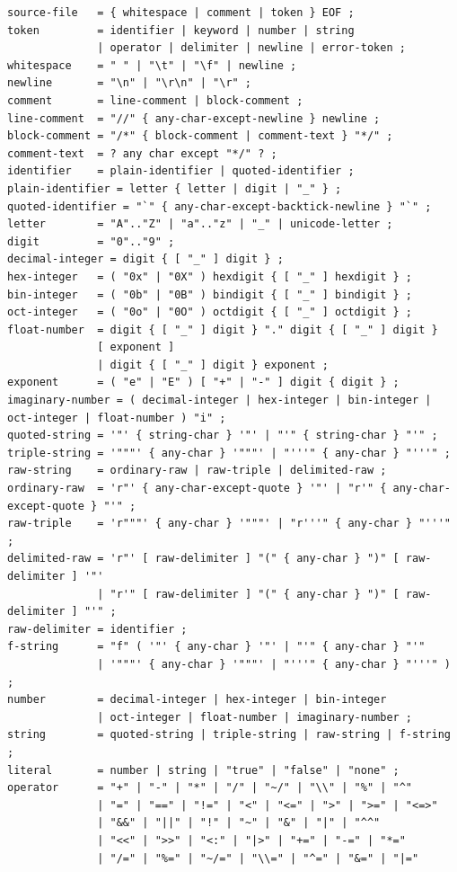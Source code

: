 \documentclass[UTF8,12pt]{ctexart}
\begin{document}
\begin{lstlisting}
source-file   = { whitespace | comment | token } EOF ;
token         = identifier | keyword | number | string
              | operator | delimiter | newline | error-token ;
whitespace    = " " | "\t" | "\f" | newline ;
newline       = "\n" | "\r\n" | "\r" ;
comment       = line-comment | block-comment ;
line-comment  = "//" { any-char-except-newline } newline ;
block-comment = "/*" { block-comment | comment-text } "*/" ;
comment-text  = ? any char except "*/" ? ;
identifier    = plain-identifier | quoted-identifier ;
plain-identifier = letter { letter | digit | "_" } ;
quoted-identifier = "`" { any-char-except-backtick-newline } "`" ;
letter        = "A".."Z" | "a".."z" | "_" | unicode-letter ;
digit         = "0".."9" ;
decimal-integer = digit { [ "_" ] digit } ;
hex-integer   = ( "0x" | "0X" ) hexdigit { [ "_" ] hexdigit } ;
bin-integer   = ( "0b" | "0B" ) bindigit { [ "_" ] bindigit } ;
oct-integer   = ( "0o" | "0O" ) octdigit { [ "_" ] octdigit } ;
float-number  = digit { [ "_" ] digit } "." digit { [ "_" ] digit }
              [ exponent ]
              | digit { [ "_" ] digit } exponent ;
exponent      = ( "e" | "E" ) [ "+" | "-" ] digit { digit } ;
imaginary-number = ( decimal-integer | hex-integer | bin-integer | oct-integer | float-number ) "i" ;
quoted-string = '"' { string-char } '"' | "'" { string-char } "'" ;
triple-string = '"""' { any-char } '"""' | "'''" { any-char } "'''" ;
raw-string    = ordinary-raw | raw-triple | delimited-raw ;
ordinary-raw  = 'r"' { any-char-except-quote } '"' | "r'" { any-char-except-quote } "'" ;
raw-triple    = 'r"""' { any-char } '"""' | "r'''" { any-char } "'''" ;
delimited-raw = 'r"' [ raw-delimiter ] "(" { any-char } ")" [ raw-delimiter ] '"'
              | "r'" [ raw-delimiter ] "(" { any-char } ")" [ raw-delimiter ] "'" ;
raw-delimiter = identifier ;
f-string      = "f" ( '"' { any-char } '"' | "'" { any-char } "'"
              | '"""' { any-char } '"""' | "'''" { any-char } "'''" ) ;
number        = decimal-integer | hex-integer | bin-integer
              | oct-integer | float-number | imaginary-number ;
string        = quoted-string | triple-string | raw-string | f-string ;
literal       = number | string | "true" | "false" | "none" ;
operator      = "+" | "-" | "*" | "/" | "~/" | "\\" | "%" | "^"
              | "=" | "==" | "!=" | "<" | "<=" | ">" | ">=" | "<=>"
              | "&&" | "||" | "!" | "~" | "&" | "|" | "^^"
              | "<<" | ">>" | "<:" | "|>" | "+=" | "-=" | "*="
              | "/=" | "%=" | "~/=" | "\\=" | "^=" | "&=" | "|="

\end{lstlisting}
\end{document}
